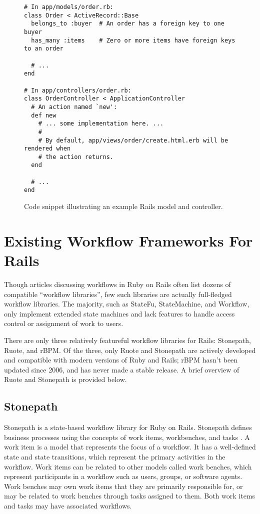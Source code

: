 \documentclass[document.tex]{subfiles}
\begin{document}
\begin{figure}[!ht]
  \begin{lstlisting}
# In app/models/order.rb:
class Order < ActiveRecord::Base
  belongs_to :buyer  # An order has a foreign key to one buyer
  has_many :items    # Zero or more items have foreign keys to an order

  # ...
end

# In app/controllers/order.rb:
class OrderController < ApplicationController
  # An action named `new':
  def new
    # ... some implementation here. ...
    #
    # By default, app/views/order/create.html.erb will be rendered when
    # the action returns.
  end

  # ...
end
  \end{lstlisting}
  \cprotect\caption{Code snippet illustrating an example Rails model and controller.}
  \label{fig:background-rails-code}
\end{figure}


\section {Existing Workflow Frameworks For Rails}
\label {sec:evaluating-existing-workflow-frameworks}

Though articles discussing workflows in Ruby on Rails often list dozens of compatible ``workflow libraries'', few such libraries are actually full-fledged workflow libraries. The majority, such as StateFu, StateMachine, and Workflow, only implement extended state machines and lack features to handle access control or assignment of work to users.

There are only three relatively featureful workflow libraries for Rails: Stonepath, Ruote, and rBPM. Of the three, only Ruote and Stonepath are actively developed and compatible with modern versions of Ruby and Rails; rBPM hasn't been updated since 2006, and has never made a stable release. A brief overview of Ruote and Stonepath is provided below.

\subsection {Stonepath}

Stonepath is a state-based workflow library for Ruby on Rails. Stonepath defines business processes using the concepts of work items, workbenches, and tasks \cite{stonepath}. A work item is a model that represents the focus of a workflow. It has a well-defined state and state transitions, which represent the primary activities in the workflow. Work items can be related to other models called work benches, which represent participants in a workflow such as users, groups, or software agents. Work benches may own work items that they are primarily responsible for, or may be related to work benches through tasks assigned to them. Both work items and tasks may have associated workflows.
\end{document}
